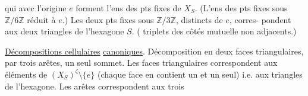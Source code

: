 
qui avec l'origine $e$ forment l'ens des pts fixes de $X_S$.
(L'ens des pts fixes sous $\mathbb Z/6\mathbb Z$  réduit
à $e$.) Les deux pts fixes sous $\mathbb Z/3\mathbb Z$, distincts de $e$, corres-\newline
pondent aux deux triangles  de l'hexagone $S$.
( triplets des côtés mutuelle non adjacents.)

\uline{Décompositions cellulaires}\newline
\uline{canoniques}. Décomposition en deux faces triangulaires, par trois arêtes,
un seul sommet. Les faces triangulaires correspondent aux éléments de
$(X_S)^\zeta\setminus\{e\}$ (chaque face en contient un et un seul) i.e.
aux triangles  de l'hexagone. Les arêtes correspondent aux trois

